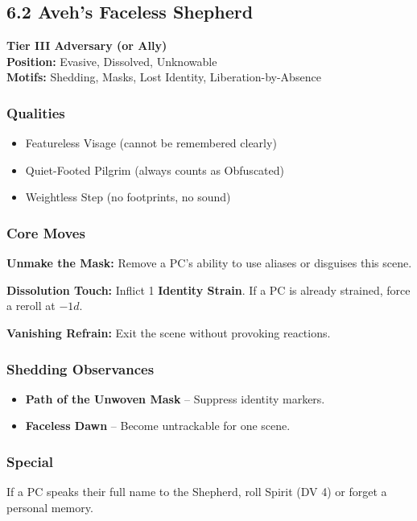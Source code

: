 \documentclass[11pt]{book}
\begin{document}
\subsection{6.2 Aveh's Faceless Shepherd}

\textbf{Tier III Adversary (or Ally)} \\
\textbf{Position:} Evasive, Dissolved, Unknowable \\
\textbf{Motifs:} Shedding, Masks, Lost Identity, Liberation-by-Absence

\subsubsection*{Qualities}
\begin{itemize}[leftmargin=*]
    \item Featureless Visage (cannot be remembered clearly)
    \item Quiet-Footed Pilgrim (always counts as Obfuscated)
    \item Weightless Step (no footprints, no sound)
\end{itemize}

\subsubsection*{Core Moves}
\textbf{Unmake the Mask:} Remove a PC's ability to use aliases or disguises this scene.

\textbf{Dissolution Touch:} Inflict 1 \textbf{Identity Strain}.  
If a PC is already strained, force a reroll at $-1d$.

\textbf{Vanishing Refrain:} Exit the scene without provoking reactions.

\subsubsection*{Shedding Observances}
\begin{itemize}[leftmargin=*]
    \item \textbf{Path of the Unwoven Mask} -- Suppress identity markers.
    \item \textbf{Faceless Dawn} -- Become untrackable for one scene.
\end{itemize}

\subsubsection*{Special}
If a PC speaks their full name to the Shepherd, roll Spirit (DV 4) or forget a personal memory.
\end{document}
